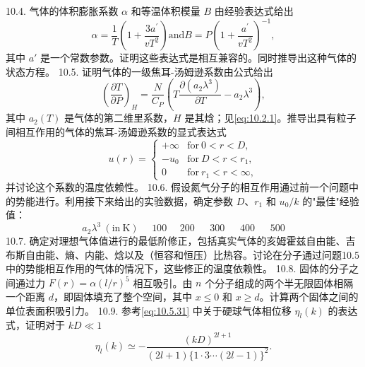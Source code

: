10.4. 气体的体积膨胀系数 \(\alpha\) 和等温体积模量 \(B\) 由经验表达式给出
\begin{equation}\tag{10.7.32}\label{eq:10.7.32}
\alpha = \frac { 1 } { T } \left( 1 + \frac { 3 a ^{\prime} } { v T ^{2} } \right)  \mathrm { a n d }  B = P \left( 1 + \frac { a ^{\prime} } { v T ^{2} } \right) ^{- 1} ,
\end{equation}
其中 \(a'\) 是一个常数参数。证明这些表达式是相互兼容的。同时推导出这种气体的状态方程。
10.5. 证明气体的一级焦耳-汤姆逊系数由公式给出
\begin{equation}\tag{10.7.33}\label{eq:10.7.33}
\left( \frac { \partial T } { \partial P } \right) _ { H } = \frac { N } { C _ { P } } \left( T \frac { \partial ( a _ { 2 } \lambda ^{3} ) } { \partial T } - a _ { 2 } \lambda ^{3} \right) ,
\end{equation}
其中 \(a_{2}(T)\) 是气体的第二维里系数，\(H\) 是其焓；见\autoref{eq:10.2.1}。推导出具有粒子间相互作用的气体的焦耳-汤姆逊系数的显式表达式
\begin{equation}\tag{10.7.34}\label{eq:10.7.34}
u ( r ) = \left\{ \begin{array}{ll} { + \infty } & { \mathrm { f o r ~ } 0 < r < D , } \\{ - u _ { 0 } } & { \mathrm { f o r ~ } D < r < r _ { 1 } , } \\{ 0 } & { \mathrm { f o r ~ } r _ { 1 } < r < \infty , } \end{array} \right.
\end{equation}
并讨论这个系数的温度依赖性。
10.6. 假设氮气分子的相互作用通过前一个问题中的势能进行。利用接下来给出的实验数据，确定参数 \(D\)、\(r_{1}\) 和 \(u_{0}/k\) 的"最佳"经验值：
\begin{equation}\tag{10.7.35}\label{eq:10.7.35}
a _ { 2 } \lambda ^{3} \ ( \mathrm { i n \ K } ) \ \ \ \ \ \ 10 0 \ \ \ \ \ \ 20 0 \ \ \ \ \ \ \ 30 0 \ \ \ \ \ \ \ 40 0 \ \ \ \ \ \ \ 50 0
\end{equation}
10.7. 确定对理想气体值进行的最低阶修正，包括真实气体的亥姆霍兹自由能、吉布斯自由能、熵、内能、焓以及（恒容和恒压）比热容。讨论在分子通过问题10.5中的势能相互作用的气体的情况下，这些修正的温度依赖性。
10.8. 固体的分子之间通过力 \(F(r)=\alpha(l/r)^{5}\) 相互吸引。由 \(n\) 个分子组成的两个半无限固体相隔一个距离 \(d\)，即固体填充了整个空间，其中 \(x\leq0\) 和 \(x\geq d\)。计算两个固体之间的单位表面积吸引力。
10.9. 参考\autoref{eq:10.5.31} 中关于硬球气体相位移 \(\eta_{l}(k)\) 的表达式，证明对于 \(kD \ll 1\)
\begin{equation}\tag{10.7.36}\label{eq:10.7.36}
\eta _ { l } ( k ) \simeq - \frac { ( k D ) ^{2 l + 1} } { ( 2 l + 1 ) \{ 1 \cdot 3 \cdots ( 2 l - 1 ) \} ^{2} } .
\end{equation}
